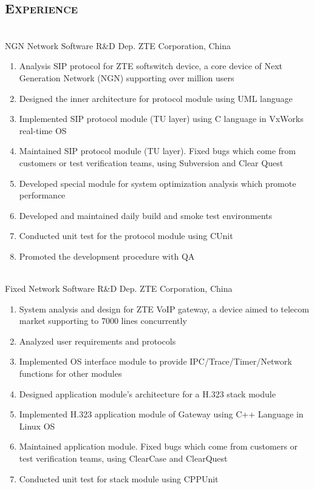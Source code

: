 \documentclass[margin,11pt]{res}
\begin{document}
\begin{resume}
\section{\textsc{Experience}} 
     \\
    NGN Network Software R\&D Dep. ZTE Corporation, China

    \begin{enumerate}\itemsep -2pt %
    \item Analysis SIP protocol for ZTE softswitch device, a core device of Next Generation Network
      (NGN) supporting over million users
    \item Designed the inner architecture for protocol module using UML language
    \item Implemented SIP protocol module (TU layer) using C language in VxWorks real-time OS
    \item Maintained SIP protocol module (TU layer). Fixed bugs which come from customers or test
      verification teams, using Subversion and Clear Quest
    \item Developed special module for system optimization analysis which promote performance
    \item Developed and maintained daily build and smoke test environments
    \item Conducted unit test for the protocol module using CUnit
    \item Promoted the development procedure with QA
    \end{enumerate}
 
     \\
    Fixed Network Software R\&D Dep. ZTE Corporation, China
     \begin{enumerate}\itemsep -2pt %
     \item System analysis and design for ZTE VoIP gateway, a device aimed to telecom market
       supporting to 7000 lines concurrently
     \item Analyzed user requirements and protocols
     \item Implemented OS interface module to provide IPC/Trace/Timer/Network functions for other modules
     \item Designed application module's architecture for a H.323 stack module
     \item Implemented H.323 application module of Gateway using C++ Language in Linux OS
     \item Maintained application module. Fixed bugs which come from customers or test
      verification teams, using ClearCase and ClearQuest
     \item Conducted unit test for stack module using CPPUnit
     \end{enumerate} 


\end{resume}
\end{document}
